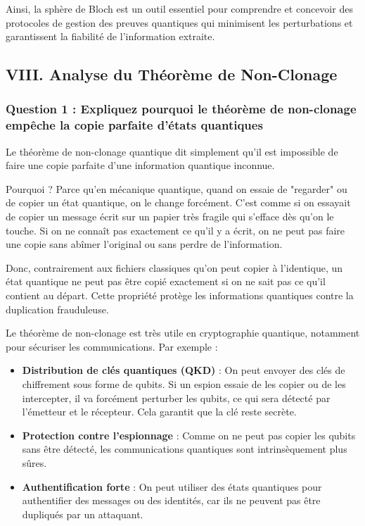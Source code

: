 \documentclass[12pt, a4paper]{article}
\begin{document}
		Ainsi, la sphère de Bloch est un outil essentiel pour comprendre et concevoir des protocoles de gestion des preuves quantiques qui minimisent les perturbations et garantissent la fiabilité de l'information extraite.
		
		\subsection*{VIII. Analyse du Théorème de Non-Clonage}
		
		\subsubsection*{Question 1 : Expliquez pourquoi le théorème de non-clonage empêche la copie parfaite d'états quantiques}
		
		Le théorème de non-clonage quantique dit simplement qu'il est impossible de faire une copie parfaite d'une information quantique inconnue.
		
		Pourquoi ? Parce qu'en mécanique quantique, quand on essaie de "regarder" ou de copier un état quantique, on le change forcément. C'est comme si on essayait de copier un message écrit sur un papier très fragile qui s'efface dès qu'on le touche. Si on ne connaît pas exactement ce qu'il y a écrit, on ne peut pas faire une copie sans abîmer l'original ou sans perdre de l'information.
		
		Donc, contrairement aux fichiers classiques qu'on peut copier à l'identique, un état quantique ne peut pas être copié exactement si on ne sait pas ce qu'il contient au départ. Cette propriété protège les informations quantiques contre la duplication frauduleuse.
		
		Le théorème de non-clonage est très utile en cryptographie quantique, notamment pour sécuriser les communications. Par exemple :
		
		\begin{itemize}
			\item \textbf{Distribution de clés quantiques (QKD)} : On peut envoyer des clés de chiffrement sous forme de qubits. Si un espion essaie de les copier ou de les intercepter, il va forcément perturber les qubits, ce qui sera détecté par l'émetteur et le récepteur. Cela garantit que la clé reste secrète.
			\item \textbf{Protection contre l'espionnage} : Comme on ne peut pas copier les qubits sans être détecté, les communications quantiques sont intrinsèquement plus sûres.
			\item \textbf{Authentification forte} : On peut utiliser des états quantiques pour authentifier des messages ou des identités, car ils ne peuvent pas être dupliqués par un attaquant.
		\end{itemize}
		
\end{document}
